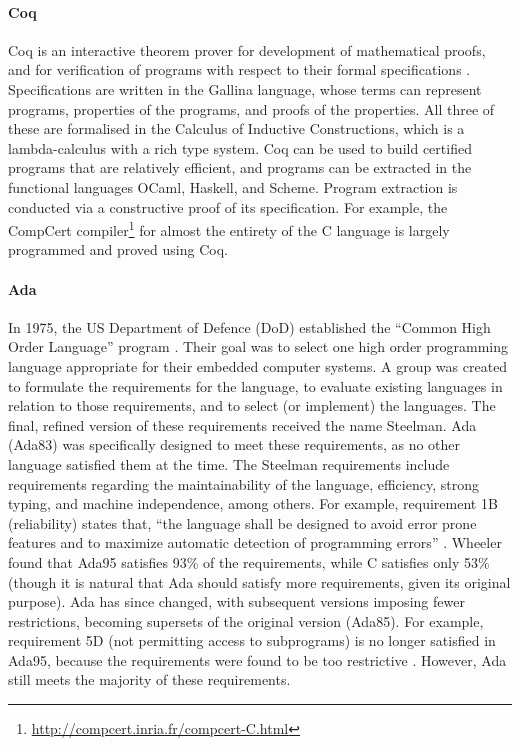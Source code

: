 \paragraph{Coq}
Coq is an interactive theorem prover for development of mathematical proofs, and for verification of programs with respect to their formal specifications \cite{coqRM}.
Specifications are written in the Gallina language, whose terms can represent programs, properties of the programs, and proofs of the properties.
All three of these are formalised in the Calculus of Inductive Constructions, which is a lambda-calculus with a rich type system.
Coq can be used to build certified programs that are relatively efficient, and programs can be extracted in the functional languages OCaml, Haskell, and Scheme.
Program extraction is conducted via a constructive proof of its specification.
For example, the CompCert compiler\footnote{\url{http://compcert.inria.fr/compcert-C.html}} for almost the entirety of the C language is largely programmed and proved using Coq.

\paragraph{Ada}
In 1975, the US Department of Defence (DoD) established the ``Common High Order Language'' program \cite{wheeler1997}.
Their goal was to select one high order programming language appropriate for their embedded computer systems.
A group was created to formulate the requirements for the language, to evaluate existing languages in relation to those requirements, and to select (or implement) the languages.
The final, refined version of these requirements received the name Steelman.
Ada (Ada83) was specifically designed to meet these requirements, as no other language satisfied them at the time.
The Steelman requirements include requirements regarding the maintainability of the language, efficiency, strong typing, and machine independence, among others.
For example, requirement 1B (reliability) states that, ``the language shall be designed to avoid error prone features and to maximize automatic detection of programming errors'' \cite{wheeler1997}.
Wheeler found that Ada95 satisfies 93\% of the requirements, while C satisfies only 53\% (though it is natural that Ada should satisfy more requirements, given its original purpose).
Ada has since changed, with subsequent versions imposing fewer restrictions, becoming supersets of the original version (Ada85).
For example, requirement 5D (not permitting access to subprograms) is no longer satisfied in Ada95, because the requirements were found to be too restrictive \cite{wheeler1997}.
However, Ada still meets the majority of these requirements.

